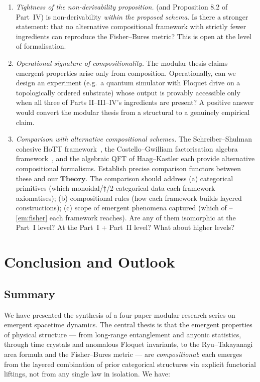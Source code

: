 \documentclass[12pt]{article}
\theoremstyle{definition}
\theoremstyle{remark}
\newcommand{\Theory}{\mathbf{Theory}}
\begin{document}
\begin{enumerate}[label=O\arabic*., leftmargin=2.6em, resume]

\item \emph{Tightness of the non-derivability proposition.}
 (and Proposition 8.2 of Part~IV) is
non-derivability \emph{within the proposed schema}. Is there a stronger
statement: that no alternative compositional framework with strictly
fewer ingredients can reproduce the Fisher--Bures metric? This is open at
the level of formalisation.

\item \emph{Operational signature of compositionality.}
The modular thesis claims emergent properties arise only from composition.
Operationally, can we design an experiment (e.g.\ a quantum simulator
with Floquet drive on a topologically ordered substrate) whose output is
provably accessible only when all three of Parts II--III--IV's
ingredients are present? A positive answer would convert the modular
thesis from a structural to a genuinely empirical claim.

\item \emph{Comparison with alternative compositional schemes.}
The Schreiber--Shulman cohesive HoTT framework~\cite{schreibershulman2014},
the Costello--Gwilliam factorisation algebra framework~\cite{costello2017},
and the algebraic QFT of Haag--Kastler each provide alternative
compositional formalisms. Establish precise
comparison functors between these and our $\Theory$. The comparison
should address (a) categorical primitives (which monoidal/$\dagger$/2-categorical
data each framework axiomatises); (b) compositional rules (how each
framework builds layered constructions); (c) scope of emergent phenomena
captured (which of --\ref{em:fisher} each framework reaches).
Are any of them isomorphic at the Part~I level? At the Part~I + Part~II
level? What about higher levels?

\end{enumerate}

\section{Conclusion and Outlook}
\label{sec:conclusion}

\subsection{Summary}

We have presented the synthesis of a four-paper modular research series on
emergent spacetime dynamics. The central thesis is that the emergent
properties of physical structure --- from long-range entanglement and
anyonic statistics, through time crystals and anomalous Floquet
invariants, to the Ryu--Takayanagi area formula and the Fisher--Bures
metric --- are \emph{compositional}\/: each emerges from the layered
combination of prior categorical structures via explicit functorial
liftings, not from any single law in isolation. We have:
\end{document}
